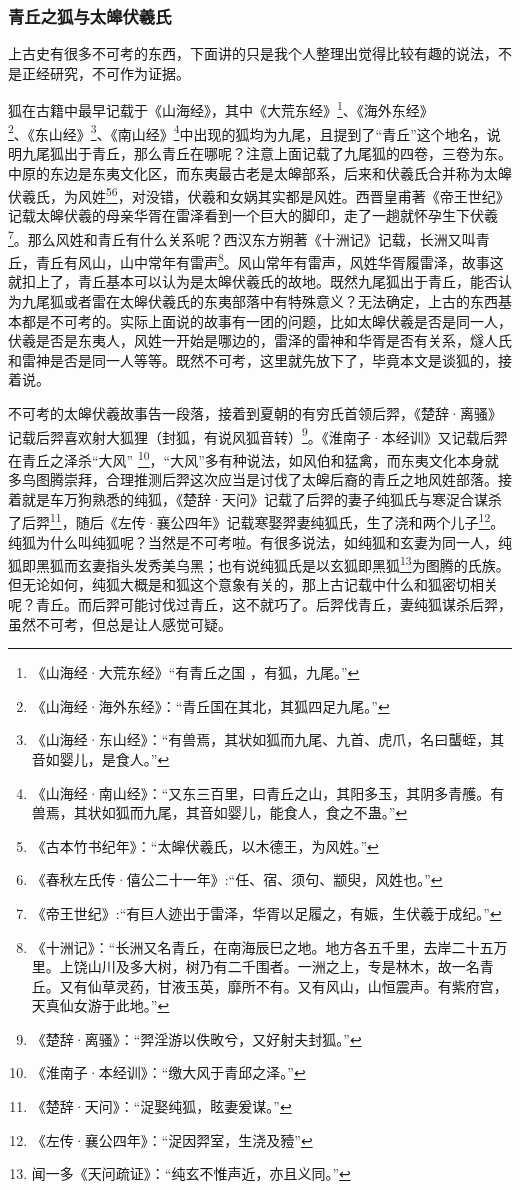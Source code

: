 \documentclass[UTF8, 12pt, A4paper]{article}
\begin{document}
\subsubsection{青丘之狐与太皞伏羲氏}

上古史有很多不可考的东西，下面讲的只是我个人整理出觉得比较有趣的说法，不是正经研究，不可作为证据。

狐在古籍中最早记载于《山海经》，其中《大荒东经》\footnote{《山海经·大荒东经》“有青丘之国 ，有狐，九尾。” }、《海外东经》\footnote{《山海经·海外东经》：“青丘国在其北，其狐四足九尾。”}、《东山经》\footnote{《山海经·东山经》：“有兽焉，其状如狐而九尾、九首、虎爪，名曰蠪蛭，其音如婴儿，是食人。”}、《南山经》\footnote{《山海经·南山经》：“又东三百里，曰青丘之山，其阳多玉，其阴多青雘。有兽焉，其状如狐而九尾，其音如婴儿，能食人，食之不蛊。”}中出现的狐均为九尾，且提到了“青丘”这个地名，说明九尾狐出于青丘，那么青丘在哪呢？注意上面记载了九尾狐的四卷，三卷为东。中原的东边是东夷文化区，而东夷最古老是太皞部系，后来和伏羲氏合并称为太皞伏羲氏，为风姓\footnote{《古本竹书纪年》：“太皞伏羲氏，以木德王，为风姓。”}\footnote{《春秋左氏传·僖公二十一年》:“任、宿、须句、颛臾，风姓也。”}，对没错，伏羲和女娲其实都是风姓。西晋皇甫著《帝王世纪》记载太皞伏羲的母亲华胥在雷泽看到一个巨大的脚印，走了一趟就怀孕生下伏羲\footnote{《帝王世纪》:“有巨人迹出于雷泽，华胥以足履之，有娠，生伏羲于成纪。”}。那么风姓和青丘有什么关系呢？西汉东方朔著《十洲记》记载，长洲又叫青丘，青丘有风山，山中常年有雷声\footnote{《十洲记》：“长洲又名青丘，在南海辰巳之地。地方各五千里，去岸二十五万里。上饶山川及多大树，树乃有二千围者。一洲之上，专是林木，故一名青丘。又有仙草灵药，甘液玉英，靡所不有。又有风山，山恒震声。有紫府宫，天真仙女游于此地。”}。风山常年有雷声，风姓华胥履雷泽，故事这就扣上了，青丘基本可以认为是太皞伏羲氏的故地。既然九尾狐出于青丘，能否认为九尾狐或者雷在太皞伏羲氏的东夷部落中有特殊意义？无法确定，上古的东西基本都是不可考的。实际上面说的故事有一团的问题，比如太皞伏羲是否是同一人，伏羲是否是东夷人，风姓一开始是哪边的，雷泽的雷神和华胥是否有关系，燧人氏和雷神是否是同一人等等。既然不可考，这里就先放下了，毕竟本文是谈狐的，接着说。

不可考的太皞伏羲故事告一段落，接着到夏朝的有穷氏首领后羿，《楚辞·离骚》记载后羿喜欢射大狐狸（封狐，有说风狐音转）\footnote{《楚辞·离骚》：“羿淫游以佚畋兮，又好射夫封狐。”}。《淮南子·本经训》又记载后羿在青丘之泽杀“大风” \footnote{《淮南子·本经训》：“缴大风于青邱之泽。”}，“大风”多有种说法，如风伯和猛禽，而东夷文化本身就多鸟图腾崇拜，合理推测后羿这次应当是讨伐了太皞后裔的青丘之地风姓部落。接着就是车万狗熟悉的纯狐，《楚辞·天问》记载了后羿的妻子纯狐氏与寒浞合谋杀了后羿\footnote{《楚辞·天问》：“浞娶纯狐，眩妻爰谋。”}，随后《左传·襄公四年》记载寒娶羿妻纯狐氏，生了浇和两个儿子\footnote{《左传·襄公四年》：“浞因羿室，生浇及豷”}。纯狐为什么叫纯狐呢？当然是不可考啦。有很多说法，如纯狐和玄妻为同一人，纯狐即黑狐而玄妻指头发秀美乌黑；也有说纯狐氏是以玄狐即黑狐\footnote{闻一多《天问疏证》：“纯玄不惟声近，亦且义同。”}为图腾的氏族。但无论如何，纯狐大概是和狐这个意象有关的，那上古记载中什么和狐密切相关呢？青丘。而后羿可能讨伐过青丘，这不就巧了。后羿伐青丘，妻纯狐谋杀后羿，虽然不可考，但总是让人感觉可疑。
\end{document}
